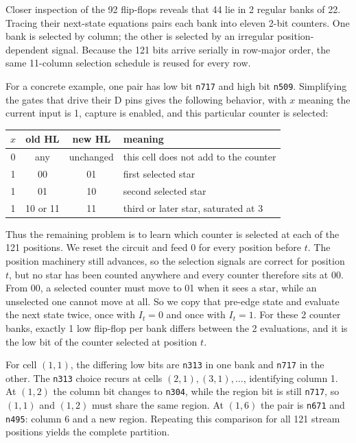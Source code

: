 \documentclass[11pt]{article}
\begin{document}
Closer inspection of the 92 flip-flops reveals that 44 lie in 2 regular banks of 22. Tracing their next-state equations pairs each bank into eleven 2-bit counters. One bank is selected by column; the other is selected by an irregular position-dependent signal. Because the 121 bits arrive serially in row-major order, the same 11-column selection schedule is reused for every row.

For a concrete example, one pair has low bit \texttt{n717} and high bit \texttt{n509}. Simplifying the gates that drive their D pins gives the following behavior, with $x$ meaning the current input is 1, capture is enabled, and this particular counter is selected:

\begin{center}
  \small
  \begin{tabular}{@{}cccl@{}}
    \toprule
    $x$ & old HL & new HL & meaning \\
    \midrule
    0 & any & unchanged & this cell does not add to the counter \\
    1 & 00 & 01 & first selected star \\
    1 & 01 & 10 & second selected star \\
    1 & 10 or 11 & 11 & third or later star, saturated at 3 \\
    \bottomrule
  \end{tabular}
\end{center}

Thus the remaining problem is to learn which counter is selected at each of the 121 positions. We reset the circuit and feed 0 for every position before $t$. The position machinery still advances, so the selection signals are correct for position $t$, but no star has been counted anywhere and every counter therefore sits at 00. From 00, a selected counter must move to 01 when it sees a star, while an unselected one cannot move at all. So we copy that pre-edge state and evaluate the next state twice, once with $I_t=0$ and once with $I_t=1$. For these 2 counter banks, exactly 1 low flip-flop per bank differs between the 2 evaluations, and it is the low bit of the counter selected at position $t$.

For cell $(1,1)$, the differing low bits are \texttt{n313} in one bank and \texttt{n717} in the other. The \texttt{n313} choice recurs at cells $(2,1),(3,1),\ldots$, identifying column 1. At $(1,2)$ the column bit changes to \texttt{n304}, while the region bit is still \texttt{n717}, so $(1,1)$ and $(1,2)$ must share the same region. At $(1,6)$ the pair is \texttt{n671} and \texttt{n495}: column 6 and a new region. Repeating this comparison for all 121 stream positions yields the complete partition.
\end{document}
